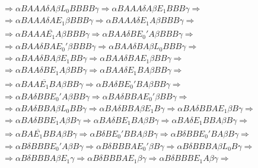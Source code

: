 \begin{ejercicio}
\begin{enumerate}
\begin{description}
\begin{align*}
                      &\Rightarrow \alpha BAAA \delta A\beta L_0 BBBB \gamma \Rightarrow \alpha BAAA \delta A\beta E_1 BBB \gamma \Rightarrow \\
                      &\Rightarrow \alpha BAAA \delta A E_1\beta BBB \gamma \Rightarrow \alpha BAAA\delta E_1 A \beta BBB \gamma \Rightarrow \\
                      &\Rightarrow \alpha B AAA \overline{E_1} A \beta BBB \gamma \Rightarrow \alpha BAA \delta B E_0' A \beta BBB \gamma \Rightarrow \\ 
                      &\Rightarrow \alpha BAA \delta BA E_0' \beta BBB \gamma \Rightarrow \alpha BAA \delta BA \beta L_0 BBB \gamma \Rightarrow \\
                      &\Rightarrow \alpha BAA \delta BA \beta E_1 BB \gamma \Rightarrow \alpha BAA \delta BA E_1 \beta BB \gamma \Rightarrow \\
                      &\Rightarrow \alpha BAA \delta BE_1 A \beta BB \gamma \Rightarrow \alpha BAA \delta E_1 BA \beta BB \gamma \Rightarrow \\
                      &\Rightarrow \alpha BAA \overline{E_1} BA \beta BB \gamma \Rightarrow \alpha BA \delta B E_0' BA \beta BB \gamma \Rightarrow \\
                      &\Rightarrow \alpha BA \delta BBE_0' A \beta BB \gamma \Rightarrow \alpha BA \delta BBA E_0' \beta BB \gamma \Rightarrow \\
                      &\Rightarrow \alpha BA \delta BBA \beta L_0 BB \gamma \Rightarrow \alpha BA \delta BBA \beta E_1 B \gamma \Rightarrow \alpha BA \delta BBA E_1 \beta B\gamma \Rightarrow \\
                      &\Rightarrow \alpha BA \delta BBE_1 A \beta B \gamma \Rightarrow \alpha BA \delta B E_1 BA \beta B \gamma \Rightarrow \alpha BA \delta E_1 BBA \beta B \gamma \Rightarrow \\
                      &\Rightarrow \alpha BA \overline{E_1} BBA \beta B \gamma \Rightarrow \alpha B \delta B E_0' BBA \beta B \gamma \Rightarrow \alpha B\delta BB E_0' BA \beta B \gamma \Rightarrow \\
                      &\Rightarrow \alpha B\delta BBB E_0' A \beta B \gamma \Rightarrow \alpha B\delta BBBA E_0' \beta B \gamma \Rightarrow \alpha B \delta BBBA \beta L_0 B \gamma \Rightarrow \\
                      &\Rightarrow \alpha B \delta BBBA \beta E_1 \gamma \Rightarrow \alpha B \delta BBBA E_1 \beta \gamma \Rightarrow \alpha B \delta BBB E_1 A \beta \gamma \Rightarrow \\

\end{align*}
\end{description}
\end{enumerate}
\end{ejercicio}
